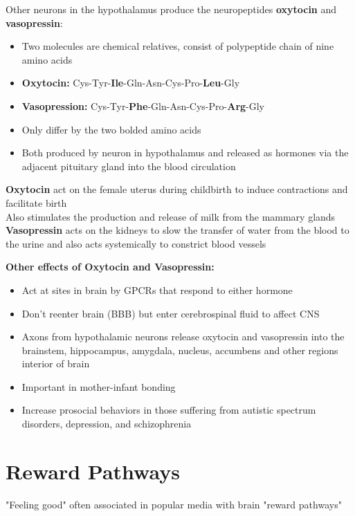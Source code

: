 \documentclass{article}
\begin{document}
\noindent Other neurons in the hypothalamus produce the neuropeptides \textbf{oxytocin} and \textbf{vasopressin}: 
\begin{itemize}
    \item Two molecules are chemical relatives, consist of polypeptide chain of nine amino acids
    \item \textbf{Oxytocin:} Cys-Tyr-\textbf{Ile}-Gln-Asn-Cys-Pro-\textbf{Leu}-Gly
    \item \textbf{Vasopression:} Cys-Tyr-\textbf{Phe}-Gln-Asn-Cys-Pro-\textbf{Arg}-Gly
    \item Only differ by the two bolded amino acids
    \item Both produced by neuron in hypothalamus and released as hormones via the adjacent pituitary gland into the blood circulation
\end{itemize}

\noindent \textbf{Oxytocin} act on the female uterus during childbirth to induce contractions and facilitate birth \\
Also stimulates the production and release of milk from the mammary glands \\

\noindent \textbf{Vasopressin} acts on the kidneys to slow the transfer of water from the blood to the urine and also acts systemically to constrict blood vessels

\noindent \textbf{Other effects of Oxytocin and Vasopressin:}
\begin{itemize}
    \item Act at sites in brain by GPCRs that respond to either hormone
    \item Don't reenter brain (BBB) but enter cerebrospinal fluid to affect CNS
    \item Axons from hypothalamic neurons release oxytocin and vasopressin into the brainstem, hippocampus, amygdala, nucleus, accumbens and other regions interior of brain
    \item Important in mother-infant bonding
    \item Increase prosocial behaviors in those suffering from autistic spectrum disorders, depression, and schizophrenia
\end{itemize}

\newpage
\section{Reward Pathways}
"Feeling good" often associated in popular media with brain "reward pathways" 
\end{document}

